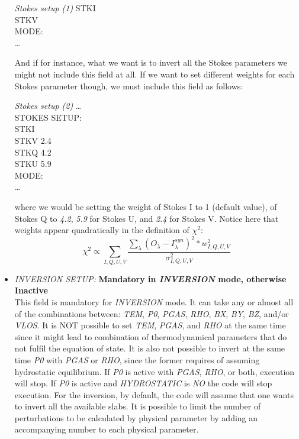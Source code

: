 \begin{itemize}
\begin{ifbox}[label={tb:stokes_setup1}]{{\it Stokes setup (1)}}
  STKI\\
  STKV\\
  MODE:\\
  \ldots
  \normalsize
\end{ifbox}
  And if for instance, what we want is to invert all the Stokes parameters we might not include this field at all. If we want to set different weights for each Stokes parameter though, we must include this field as follows:\\
\begin{ifbox}[label={tb:stokes_setup2}]{{\it Stokes setup (2)}}
  \scriptsize
  \ldots\\
  STOKES SETUP:\\
  STKI\\
  STKV  2.4\\
  STKQ  4.2\\
  STKU  5.9\\
  MODE:\\
  \ldots
  \normalsize
\end{ifbox}
  where we would be setting the weight of Stokes I to 1 (default value), of Stokes Q to {\it 4.2}, {\it 5.9} for Stokes U, and {\it 2.4} for Stokes V. Notice here that weights appear quadratically in the definition of $\chi^2$:
  \begin{equation}
  \chi^2\propto\sum_{I,Q,U,V}\frac{\sum_{\lambda}(O_{\lambda}-I^{syn}_{\lambda})^2*w_{I,Q,U,V}^2}{\sigma_{I,Q,U,V}^2}
  \end{equation}
  \item {\it INVERSION SETUP:} {\bf Mandatory in {\it INVERSION} mode, otherwise Inactive}\\
  This field is mandatory for {\it INVERSION} mode. It can take any or almost all of the combinations between: {\it TEM}, {\it P0}, {\it PGAS}, {\it RHO}, {\it BX}, {\it BY}, {\it BZ}, and/or {\it VLOS}. It is NOT possible to set {\it TEM}, {\it PGAS}, and {\it RHO} at the same time since it might lead to combination of thermodynamical parameters that do not fulfil the equation of state. It is also not possible to invert at the same time {\it P0} with {\it PGAS} or {\it RHO}, since the former requires of assuming hydrostatic equilibrium. If {\it P0} is active with {\it PGAS}, {\it RHO}, or both, execution will stop. If {\it P0} is active and {\it HYDROSTATIC} is {\it NO} the code will stop execution. For the inversion, by default, the code will assume that one wants to invert all the available slabs. It is possible to limit the number of perturbations to be calculated by physical parameter by adding an accompanying number to each physical parameter.\\

\end{itemize}
